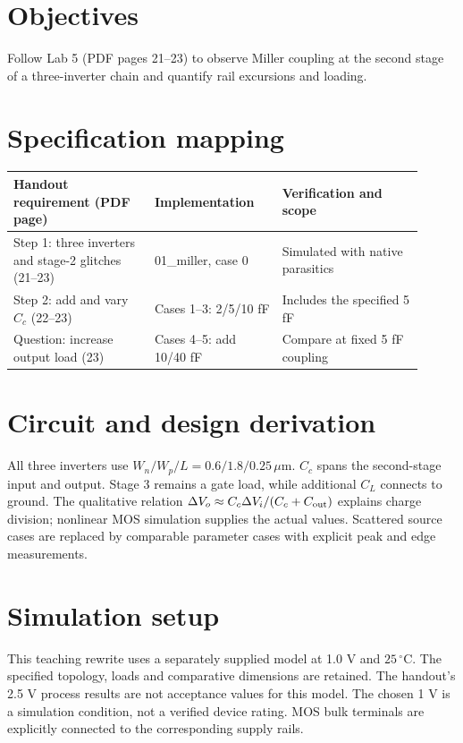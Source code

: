 \section{Objectives}
Follow Lab 5 (PDF pages 21--23) to observe Miller coupling at the second stage of a three-inverter chain and quantify rail excursions and loading.

\section{Specification mapping}
\begin{longtable}{p{0.31\linewidth}p{0.29\linewidth}p{0.31\linewidth}}
\toprule
Handout requirement (PDF page) & Implementation & Verification and scope \\\midrule
Step 1: three inverters and stage-2 glitches (21--23) & 01\_miller, case 0 & Simulated with native parasitics \\
Step 2: add and vary $C_c$ (22--23) & Cases 1--3: 2/5/10 fF & Includes the specified 5 fF \\
Question: increase output load (23) & Cases 4--5: add 10/40 fF & Compare at fixed 5 fF coupling \\
\bottomrule
\end{longtable}


\section{Circuit and design derivation}
All three inverters use $W_n/W_p/L=0.6/1.8/0.25\,\mu$m. $C_c$ spans the second-stage input and output. Stage 3 remains a gate load, while additional $C_L$ connects to ground. The qualitative relation $\Delta V_o\approx C_c\Delta V_i/(C_c+C_{\rm out})$ explains charge division; nonlinear MOS simulation supplies the actual values. Scattered source cases are replaced by comparable parameter cases with explicit peak and edge measurements.

\section{Simulation setup}
This teaching rewrite uses a separately supplied model at 1.0 V and $25\,^{\circ}\mathrm C$. The specified topology, loads and comparative dimensions are retained. The handout's 2.5 V process results are not acceptance values for this model. The chosen 1 V is a simulation condition, not a verified device rating. MOS bulk terminals are explicitly connected to the corresponding supply rails.


